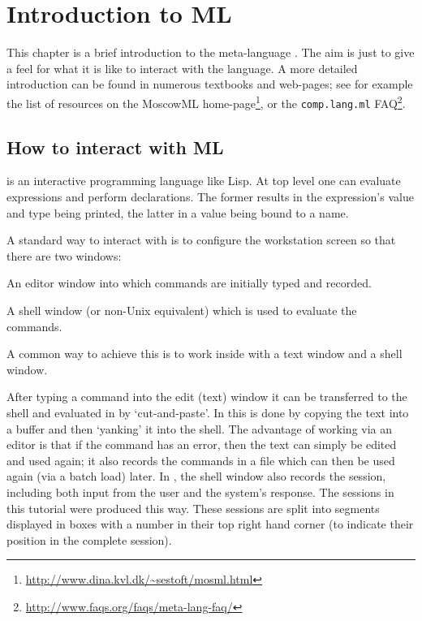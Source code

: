 \chapter{Introduction to ML}
\label{ML}

This chapter is a brief introduction to the meta-language \ML.  The
aim is just to give a feel for what it is like to interact with the
language.  A more detailed introduction can be found in numerous
textbooks and web-pages; see for example the list of resources on the
MoscowML
home-page\footnote{\url{http://www.dina.kvl.dk/~sestoft/mosml.html}},
or the \texttt{comp.lang.ml}
FAQ\footnote{\url{http://www.faqs.org/faqs/meta-lang-faq/}}.

\section{How to interact with ML}

\ML{} is an interactive programming language like Lisp. At top level
one can evaluate expressions and perform declarations. The former
results in the expression's value and type being printed, the latter
in a value being bound to a name.

A standard way to interact with \ML{} is to configure the workstation
screen so that there are two windows:
\begin{myenumerate}
\item An editor window into which \ML{} commands are initially typed
  and recorded.
\item A shell window (or non-Unix equivalent) which is used to
  evaluate the commands.
\end{myenumerate}

\noindent
A common way to achieve this is to work inside  with a text
window and a shell window.

After typing a command into the edit (text) window it can be
transferred to the shell and evaluated in \HOL{} by `cut-and-paste'. In
 this is done by copying the text into a buffer and then
`yanking' it into the shell. The advantage of working via an editor is
that if the command has an error, then the text can simply be edited
and used again; it also records the commands in a file which can then
be used again (via a batch load) later. In , the shell
window also records the session, including both input from the user
and the system's response. The sessions in this tutorial were produced
this way. These sessions are split into segments displayed in boxes
with a number in their top right hand corner (to indicate their
position in the complete session).

